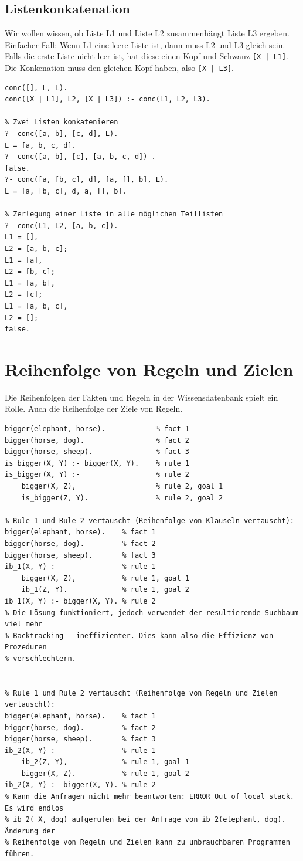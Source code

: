 \subsection{Listenkonkatenation}
Wir wollen wissen, ob Liste L1 und Liste L2 zusammenhängt Liste L3 ergeben. Einfacher Fall: Wenn L1 eine leere Liste ist, dann muss L2 und L3 gleich sein. Falls die erste Liste nicht leer ist, hat diese einen Kopf und Schwanz \verb/[X | L1]/. Die Konkenation muss den gleichen Kopf haben, also \verb/[X | L3]/.

\begin{lstlisting}[caption=Listenkonkatenation]
conc([], L, L).
conc([X | L1], L2, [X | L3]) :- conc(L1, L2, L3).

% Zwei Listen konkatenieren
?- conc([a, b], [c, d], L).
L = [a, b, c, d].
?- conc([a, b], [c], [a, b, c, d]) .
false.
?- conc([a, [b, c], d], [a, [], b], L).
L = [a, [b, c], d, a, [], b].

% Zerlegung einer Liste in alle möglichen Teillisten
?- conc(L1, L2, [a, b, c]).
L1 = [],
L2 = [a, b, c];
L1 = [a],
L2 = [b, c];
L1 = [a, b],
L2 = [c];
L1 = [a, b, c],
L2 = [];
false.
\end{lstlisting}

\section{Reihenfolge von Regeln und Zielen}
Die Reihenfolgen der Fakten und Regeln in der Wissensdatenbank spielt ein Rolle. Auch die Reihenfolge der Ziele von Regeln.

\begin{lstlisting}[caption=Reihenfolgen von Regeln und Zielen]
% Bekanntes is_bigger/2 Prädikat:
bigger(elephant, horse). 			% fact 1
bigger(horse, dog). 				% fact 2
bigger(horse, sheep). 				% fact 3
is_bigger(X, Y) :- bigger(X, Y). 	% rule 1
is_bigger(X, Y) :- 					% rule 2
	bigger(X, Z), 					% rule 2, goal 1
	is_bigger(Z, Y). 				% rule 2, goal 2

% Rule 1 und Rule 2 vertauscht (Reihenfolge von Klauseln vertauscht):
bigger(elephant, horse). 	% fact 1
bigger(horse, dog). 		% fact 2
bigger(horse, sheep). 		% fact 3
ib_1(X, Y) :- 				% rule 1
	bigger(X, Z), 			% rule 1, goal 1
	ib_1(Z, Y). 			% rule 1, goal 2
ib_1(X, Y) :- bigger(X, Y). % rule 2
% Die Lösung funktioniert, jedoch verwendet der resultierende Suchbaum viel mehr
% Backtracking - ineffizienter. Dies kann also die Effizienz von Prozeduren
% verschlechtern.


% Rule 1 und Rule 2 vertauscht (Reihenfolge von Regeln und Zielen vertauscht):
bigger(elephant, horse). 	% fact 1
bigger(horse, dog). 		% fact 2
bigger(horse, sheep). 		% fact 3
ib_2(X, Y) :- 				% rule 1
	ib_2(Z, Y), 			% rule 1, goal 1
	bigger(X, Z). 			% rule 1, goal 2
ib_2(X, Y) :- bigger(X, Y). % rule 2
% Kann die Anfragen nicht mehr beantworten: ERROR Out of local stack. Es wird endlos
% ib_2(_X, dog) aufgerufen bei der Anfrage von ib_2(elephant, dog). Änderung der
% Reihenfolge von Regeln und Zielen kann zu unbrauchbaren Programmen führen.
\end{lstlisting}

